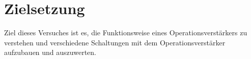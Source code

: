 \section{Zielsetzung}
Ziel dieses Versuches ist es, die Funktionsweise eines Operationsverstärkers zu verstehen und verschiedene Schaltungen mit dem Operationsverstärker aufzubauen und auszuwerten.